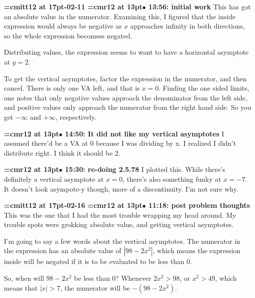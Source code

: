{\medskip\noindent\bf\font\titlefont=cmitt12 at 17pt-02-11}\medskip
{\smallskip\noindent\bf\font\titlefont=cmr12 at 13pt\titlefont $\bullet$ 13:56: initial work}\smallskip
This has got an absolute value in the numerator. Examining this, I figured that the inside expression would always be negative as $x$ approaches infinity in both directions, so the whole expression becomess negated.
\par

Distributing values, the expression seems to want to have a horizontal asymptote at $y=2$.
\par

To get the vertical asymptotes, factor the expression in the numerator, and then cancel. There is only one VA left, and that is $x=0$. Finding the one sided limits, one notes that only negative values approach the denominator from the left side, and positive values only approach the numerator from the right hand side. So you get $-\infty$ and $+\infty$, respectively.
\par

{\smallskip\noindent\bf\font\titlefont=cmr12 at 13pt\titlefont $\bullet$ 14:50: It did not like my vertical asymptotes}\smallskip
I assumed there'd be a VA at 0 because I was dividing by x. I realized I didn't distribute right. I think it should be 2.
\par

{\smallskip\noindent\bf\font\titlefont=cmr12 at 13pt\titlefont $\bullet$ 15:30: re-doing 2.5.78}\smallskip
I plotted this. While there's definitely a vertical asymptote at $x = 0$, there's also something funky at $x=-7$. It doesn't look asympote-y though, more of a discontinuity. I'm not sure why. 
\par

{\medskip\noindent\bf\font\titlefont=cmitt12 at 17pt-02-16}\medskip
{\smallskip\noindent\bf\font\titlefont=cmr12 at 13pt\titlefont $\bullet$ 11:18: post problem thoughts}\smallskip
This was the one that I had the most trouble wrapping my head around. My trouble spots were grokking absolute value, and getting vertical asymptotes.
\par

I'm going to say a few words about the vertical asymptotes. The numerator in the expression has an absolute value of $|98 - 2x^2|$, which means the expression inside will be negated if it is to be evaluated to be less than 0.
\par

So, when will $98-2x^2$ be less than 0? Whenever $2x^2 > 98$, or $x^2 > 49$, which means that $|x| > 7$, the numerator will be $-(98 - 2x^2)$.
\par

